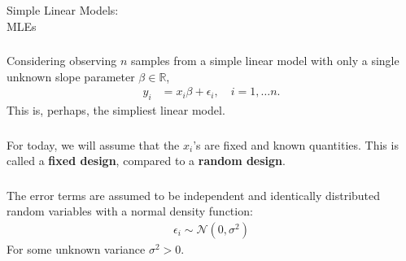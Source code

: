 \begin{frame}[fragile] \frametitle{}

\begin{flushright}
{\color{yaleblue}\sc\fontsize{1cm}{0cm}\selectfont Simple Linear Models:\\\vspace{0.2cm} MLEs}
\end{flushright}

\end{frame}

\begin{frame}[fragile] \frametitle{}

Considering observing $n$ samples
from a simple linear model with only a single unknown
slope parameter $\beta \in \mathbb{R}$, \pause
\begin{align*}
y_i &= x_i\beta  + \epsilon_i, \quad i = 1, \ldots n.
\end{align*}
This is, perhaps, the simpliest linear model.

\end{frame}

\begin{frame}[fragile] \frametitle{}

For today, we will assume that the $x_i$'s are fixed and
known quantities. This is called a {\bf fixed design}, compared
to a {\bf random design}.

\end{frame}

\begin{frame}[fragile] \frametitle{}

The error terms are assumed to be independent and identically
distributed random variables with a normal density function:
\begin{align*}
\epsilon_i \sim \mathcal{N}(0, \sigma^2)
\end{align*}
For some unknown variance $\sigma^2 > 0$.

\end{frame}

